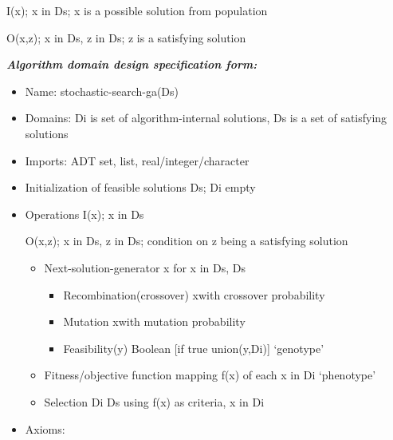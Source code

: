 \documentclass[journal]{IEEEtran}
\begin{document}
I(x); x in Ds; x is a possible solution from population\par

O(x,z); x in Ds, z in Ds; z is a satisfying solution\par

\textbf{\textit{Algorithm domain design specification form:}}\par

\begin{itemize}
	\item Name: stochastic-search-ga(Ds)\par

	\item Domains: Di is set of algorithm-internal solutions, Ds is a set of satisfying solutions\par

	\item Imports: ADT set, list, real/integer/character\par

	\item Initialization of feasible solutions \textrightarrow Ds; Di empty\par

	\item Operations I(x); x in Ds\par

O(x,z); x in Ds, z in Ds; condition on z being a satisfying solution\par

\begin{itemize}
	\item Next-solution-generator \textrightarrow x for x in Ds, Ds\textrightarrowDi\par

\begin{itemize}
	\item Recombination(crossover) x\textrightarrowy with crossover probability\par

	\item Mutation x\textrightarrowy with mutation probability\par

	\item Feasibility(y) \textrightarrow Boolean [if true union(y,Di)] ‘genotype’\par

\end{itemize}
	\item Fitness/objective function mapping f(x) of each x in Di ‘phenotype’\par

	\item Selection Di \textrightarrow Ds using f(x) as criteria, x in Di
\end{itemize}\par

	\item Axioms:
\end{itemize}\par
\end{document}
